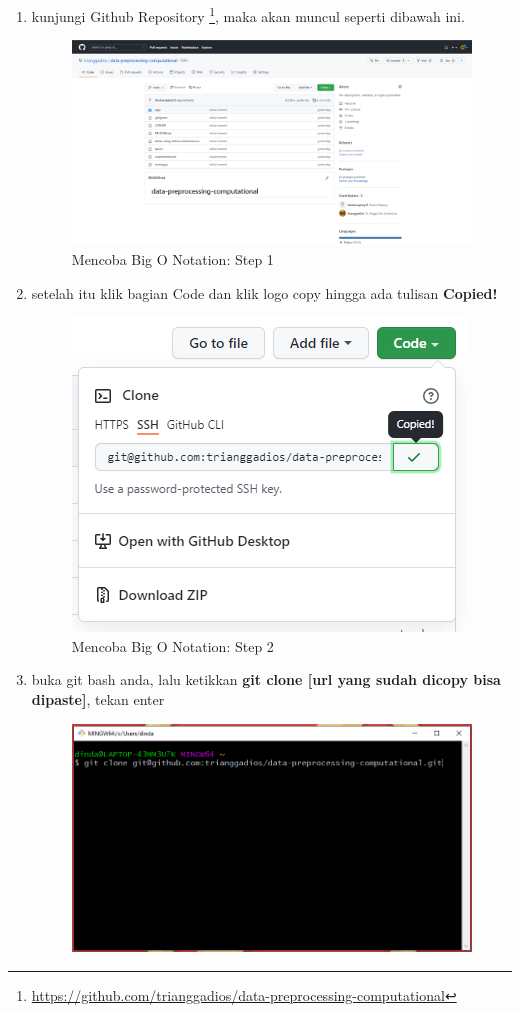 \begin{enumerate}
\item kunjungi Github Repository \footnote[1]{\url{https://github.com/trianggadios/data-preprocessing-computational}}, maka akan muncul seperti dibawah ini.
\begin{figure}[H]
        \centerline{\includegraphics[scale=0.35]{figures/mencoba-computational/step1}}
        \caption{Mencoba Big O Notation: Step 1}
\end{figure}
\item setelah itu klik bagian Code dan klik logo copy hingga ada tulisan \textbf{Copied!}
\begin{figure}[H]
        \centerline{\includegraphics[scale=0.35]{figures/mencoba-computational/step2}}
        \caption{Mencoba Big O Notation: Step 2}
\end{figure}
\item buka git bash anda, lalu ketikkan \textbf{git clone [url yang sudah dicopy bisa dipaste]}, tekan enter
\begin{figure}[H]
        \centerline{\includegraphics[scale=0.35]{figures/mencoba-computational/step3}}

\end{figure}
\end{enumerate}
